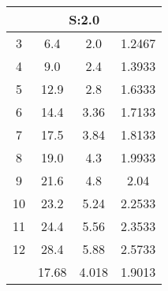
\begin{table}[H]
\begin{tabular}{c|ccc}
\multicolumn{4}{c}{S:2.0}\\\hline
3 & 6.4 & 2.0 & 1.2467\\
4 & 9.0 & 2.4 & 1.3933\\
5 & 12.9 & 2.8 & 1.6333\\
6 & 14.4 & 3.36 & 1.7133\\
7 & 17.5 & 3.84 & 1.8133\\
8 & 19.0 & 4.3 & 1.9933\\
9 & 21.6 & 4.8 & 2.04\\
10 & 23.2 & 5.24 & 2.2533\\
11 & 24.4 & 5.56 & 2.3533\\
12 & 28.4 & 5.88 & 2.5733\\
\hline
& 17.68 & 4.018 & 1.9013\\
\end{tabular}
\end{table}